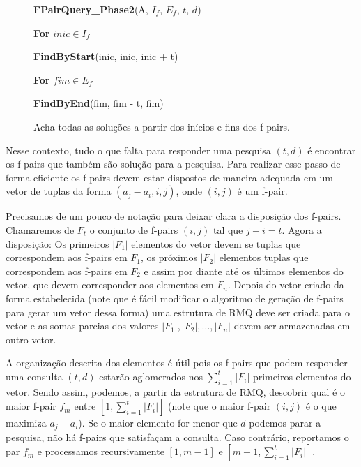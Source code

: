 \documentclass[12pt]{article}
\begin{document}
\begin{figure}
\begin{framed}
{\bf FPairQuery\_Phase2}(A, $I_f$, $E_f$, $t$, $d$)

\hspace{1cm} {\bf For} $inic \in I_f$

\hspace{2cm} {\bf FindByStart}(inic, inic, inic + t)

\hspace{1cm} {\bf For} $fim \in E_f$

\hspace{2cm} {\bf FindByEnd}(fim, fim - t, fim)

\caption{Acha todas as soluções a partir dos inícios e fins dos f-pairs.}
\label{fpairqueryphase2}
\end{framed}
\end{figure}


Nesse contexto, tudo o que falta para responder uma pesquisa $(t,d)$
é encontrar os f-pairs que também são solução para a pesquisa. 
Para realizar esse passo de forma eficiente os f-pairs devem
estar dispostos de maneira adequada em um vetor de tuplas da forma $(a_j - a_i, i, j)$,
onde $(i, j)$ é um f-pair.

Precisamos de um pouco de notação para deixar clara a disposição dos f-pairs.
Chamaremos de $F_t$ o conjunto de f-pairs $(i, j)$ tal que $j - i = t$. Agora 
a disposição: Os primeiros $|F_1|$ elementos do vetor devem se tuplas que correspondem aos f-pairs em $F_1$,
os próximos $|F_2|$ elementos tuplas que correspondem aos f-pairs em $F_2$ e assim por diante 
até os últimos elementos do vetor, que devem corresponder aos elementos em $F_n$.
Depois do vetor criado da forma estabelecida (note que é fácil modificar o 
algoritmo de geração de f-pairs para gerar um vetor dessa forma) uma estrutura de
RMQ deve ser criada para o vetor e as somas parcias dos valores $|F_1|, |F_2|, \ldots, |F_n|$
devem ser armazenadas em outro vetor. 

A organização descrita dos elementos é útil pois os f-pairs que podem responder uma consulta $(t,d)$ 
estarão aglomerados nos $\sum_{i = 1}^t |F_i|$ primeiros elementos do vetor. Sendo assim,
podemos, a partir da estrutura de RMQ, descobrir qual é o maior f-pair
$f_m$ entre $[1, \sum_{i = 1}^t |F_i|]$ (note que o maior f-pair $(i, j)$ é o que maximiza $a_j - a_i$).
Se o maior elemento for menor que $d$ podemos parar a pesquisa, não há f-pairs que satisfaçam a consulta. Caso contrário, reportamos
o par $f_m$ e processamos recursivamente $[1, m - 1]$ e $[m + 1, \sum_{i=1}^t |F_i|]$.
\end{document}
